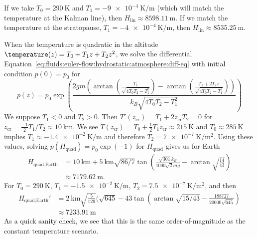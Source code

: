 \begin{node}[Hydrostatics]
\begin{node}[Atmosphere]
\begin{node}
If we take $T_{0}=\qty{290}{\kelvin}$ and
$T_{1}=\qty{-9e-4}{\kelvin\per\meter}$ (which will match the temperature
at the Kalman line),
then $H_{\text{lin}}\approx\qty{8598.11}{\meter}$.
If we match the temperature at the stratopause,
$T_{1}=\qty{-4e-4}{\kelvin\per\meter}$,
then $H_{\text{lin}}\approx\qty{8535.25}{\meter}$. 
\end{node} %

\begin{node}\label{fluids:euler-flow-000C}%
When the temperature is quadratic in the altitude $\temperature(z)=T_{0}+T_{1}z+T_{2}z^{2}$,
we solve the differential Equation~\eqref{eq:fluids:euler-flow:hydrostatic:atmosphere:diff-eq}
with initial condition $p(0)=p_{0}$ for
\begin{equation}
p(z) = p_{0}\exp \left(\frac{2 g m \left(\arctan\left(\frac{T_{1}}{\sqrt{4
    T_{0} T_{2}-T_{1}^{2}}}\right)-\arctan\left(\frac{T_{1}+2 T_{2} z}{\sqrt{4 T_{0}
    T_{2}-T_{1}^{2}}}\right)\right)}{k_{B} \sqrt{4 T_{0} T_{2}-T_{1}^{2}}}\right)
\end{equation}
We suppose $T_{1}<0$ and $T_{2}>0$. Then $T'(z_{\text{cr}})=T_{1}+2z_{\text{cr}}T_{2}=0$ for $z_{\text{cr}}=\frac{-1}{2}T_{1}/T_{2}\approx\qty{10}{\kilo\meter}$.
We see $T(z_{\text{cr}})=T_{0}+\frac{1}{2}T_{1}z_{\text{cr}}\approx\qty{215}{\kelvin}$
and $T_{0}\approx\qty{285}{\kelvin}$ implies $T_{1}\approx\qty{-1.4e-2}{\kelvin\per\meter}$
and therefore $T_{2}=\qty{7e-7}{\kelvin\per\meter\squared}$. Using these
values, solving $p(H_{\text{quad}})=p_{0}\exp(-1)$ for $H_{\text{quad}}$
gives us for Earth
\begin{equation}
  \begin{split}
H_{\text{quad},\text{Earth}}&=\qty{10}{\kilo\meter}+\qty{5}{\kilo\meter}\sqrt{86/7}\tan\left(\frac{\sqrt{301}k_{B}}{1000\sqrt{2}mg}-\arctan\sqrt{\frac{14}{43}}\right)\\
&\approx\qty{7179.62}{\meter}.
  \end{split}
\end{equation}
For $T_{0}=\qty{290}{\kelvin}$, $T_{1}=\qty{-1.5e-2}{\kelvin\per\meter}$,
$T_{2}=\qty{7.5e-7}{\kelvin\per\meter\squared}$,
and then 
\begin{equation}
\begin{split}
H_{\text{quad},\text{Earth}}'&= \qty{2}{\kilo\meter}\sqrt{\frac{5}{129}}(\sqrt{645}-43\tan\left(\arctan\sqrt{15/43}-\frac{188727}{20000\sqrt{645}}\right)\\
&\approx\qty{7233.91}{\meter}
\end{split}
\end{equation}
As a quick sanity check, we see that this is the same order-of-magnitude
as the constant temperature scenario.
\end{node} %


\end{node}
\end{node}
